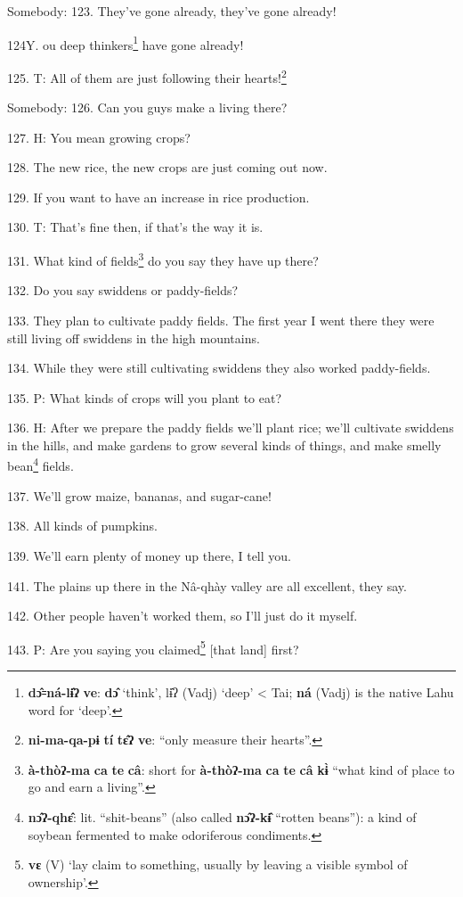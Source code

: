 Somebody: 123. They've gone already, they've gone already!

124Y. ou deep thinkers\footnote{\textbf{dɔ̂꞊ná-lɨ̂ʔ} \textbf{ve}: \textbf{dɔ̂} `think', lɨ̂ʔ (Vadj) `deep' < Tai; \textbf{ná} (Vadj) is the native Lahu word for `deep'.} have gone already!

125. T: All of them are just following their hearts!\footnote{\textbf{ni-ma-qa-pɨ} \textbf{tí} \textbf{tɛ̂ʔ} \textbf{ve}: ``only measure their hearts''.}

Somebody: 126. Can you guys make a living there?

127. H: You mean growing crops?

128. The new rice, the new crops are just coming out now.

129. If you want to have an increase in rice production.

130. T: That's fine then, if that's the way it is.

131. What kind of fields\footnote{\textbf{à-thòʔ-ma} \textbf{ca} \textbf{te} \textbf{câ}: short for \textbf{à-thòʔ-ma} \textbf{ca} \textbf{te} \textbf{câ} \textbf{kɨ̀} ``what kind of place to go and earn a living''.} do you say they have up there?

132. Do you say swiddens or paddy-fields?

133. They plan to cultivate paddy fields. The first year I went there they were
still living off swiddens in the high mountains.

134. While they were still cultivating swiddens they also worked paddy-fields.

135. P: What kinds of crops will you plant to eat?

136. H: After we prepare the paddy fields we'll plant rice; we'll cultivate swiddens
in the hills, and make gardens to grow several kinds of things, and make smelly
bean\footnote{\textbf{nɔ̂ʔ-qhɛ̂}: lit. ``shit-beans'' (also called \textbf{nɔ̂ʔ-kɨ̂} ``rotten beans''): a kind of soybean fermented to make odoriferous condiments.} fields.

137. We'll grow maize, bananas, and sugar-cane!

138. All kinds of pumpkins.

139. We'll earn plenty of money up there, I tell you.

141. The plains up there in the Nâ-qhày valley are all excellent, they say.

142. Other people haven't worked them, so I'll just do it myself.

143. P: Are you saying you claimed\footnote{\textbf{vɛ} (V) `lay claim to something, usually by leaving a visible symbol of ownership'.} [that land] first?


